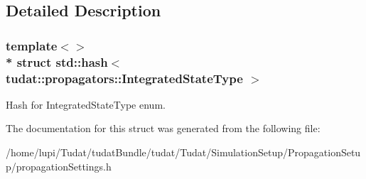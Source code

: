 \subsection{Detailed Description}
\subsubsection*{template$<$$>$\\*
struct std\+::hash$<$ tudat\+::propagators\+::\+Integrated\+State\+Type $>$}

Hash for Integrated\+State\+Type enum. 

The documentation for this struct was generated from the following file\+:\begin{DoxyCompactItemize}
\item 
/home/lupi/\+Tudat/tudat\+Bundle/tudat/\+Tudat/\+Simulation\+Setup/\+Propagation\+Setup/propagation\+Settings.\+h\end{DoxyCompactItemize}
